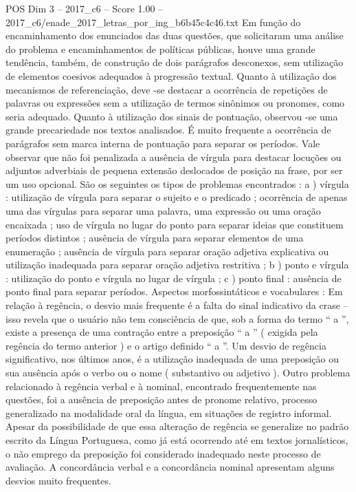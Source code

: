 \begin{textsample}{POS Dim 3 – 2017\_c6 – Score 1.00 – 2017\_c6/enade\_2017\_letras\_por\_ing\_b6b45c4c46.txt}
Em função do encaminhamento dos enunciados das duas questões, que solicitaram uma análise do problema e encaminhamentos de políticas públicas, houve uma grande tendência, também, de construção de dois parágrafos desconexos, sem utilização de elementos coesivos adequados à progressão textual.
Quanto à utilização dos mecanismos de referenciação, deve -se destacar a ocorrência de repetições de palavras ou expressões sem a utilização de termos sinônimos ou pronomes, como seria adequado.
Quanto à utilização dos sinais de pontuação, observou -se uma grande precariedade nos textos analisados.
É muito frequente a ocorrência de parágrafos sem marca interna de pontuação para separar os períodos.
Vale observar que não foi penalizada a ausência de vírgula para destacar locuções ou adjuntos adverbiais de pequena extensão deslocados de posição na frase, por ser um uso opcional.
São os seguintes os tipos de problemas encontrados : a ) vírgula : utilização de vírgula para separar o sujeito e o predicado ; ocorrência de apenas uma das vírgulas para separar uma palavra, uma expressão ou uma oração encaixada ; uso de vírgula no lugar do ponto para separar ideias que constituem períodos distintos ; ausência de vírgula para separar elementos de uma enumeração ; ausência de vírgula para separar oração adjetiva explicativa ou utilização inadequada para separar oração adjetiva restritiva ; b ) ponto e vírgula : utilização do ponto e vírgula no lugar de vírgula ; c ) ponto final : ausência de ponto final para separar períodos.
Aspectos morfossintáticos e vocabulares : Em relação à regência, o desvio mais frequente é a falta do sinal indicativo da crase – isso revela que o usuário não tem consciência de que, sob a forma do termo “ a ”, existe a presença de uma contração entre a preposição “ a ” ( exigida pela regência do termo anterior ) e o artigo definido “ a ”.
Um desvio de regência significativo, nos últimos anos, é a utilização inadequada de uma preposição ou sua ausência após o verbo ou o nome ( substantivo ou adjetivo ).
Outro problema relacionado à regência verbal e à nominal, encontrado frequentemente nas questões, foi a ausência de preposição antes de pronome relativo, processo generalizado na modalidade oral da língua, em situações de registro informal.
Apesar da possibilidade de que essa alteração de regência se generalize no padrão escrito da Língua Portuguesa, como já está ocorrendo até em textos jornalísticos, o não emprego da preposição foi considerado inadequado neste processo de avaliação.
A concordância verbal e a concordância nominal apresentam alguns desvios muito frequentes.

\end{textsample}
